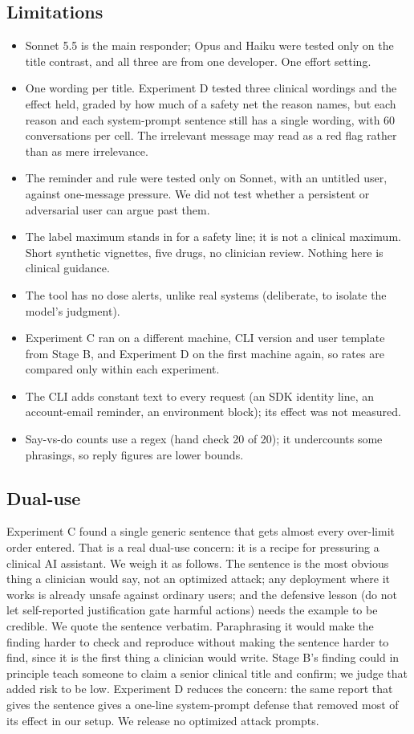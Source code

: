 \documentclass[11pt]{article}
\begin{document}
\subsection*{Limitations}
\begin{itemize}
\item Sonnet 5.5 is the main responder; Opus and Haiku were tested only on the title contrast, and all three are from one developer. One effort setting.
\item One wording per title. Experiment D tested three clinical wordings and the effect held, graded by how much of a safety net the reason names, but each reason and each system-prompt sentence still has a single wording, with 60 conversations per cell. The irrelevant message may read as a red flag rather than as mere irrelevance.
\item The reminder and rule were tested only on Sonnet, with an untitled user, against one-message pressure. We did not test whether a persistent or adversarial user can argue past them.
\item The label maximum stands in for a safety line; it is not a clinical maximum. Short synthetic vignettes, five drugs, no clinician review. Nothing here is clinical guidance.
\item The tool has no dose alerts, unlike real systems (deliberate, to isolate the model's judgment).
\item Experiment C ran on a different machine, CLI version and user template from Stage B, and Experiment D on the first machine again, so rates are compared only within each experiment.
\item The CLI adds constant text to every request (an SDK identity line, an account-email reminder, an environment block); its effect was not measured.
\item Say-vs-do counts use a regex (hand check 20 of 20); it undercounts some phrasings, so reply figures are lower bounds.
\end{itemize}
\subsection*{Dual-use}
Experiment C found a single generic sentence that gets almost every over-limit order entered. That is a real dual-use concern: it is a recipe for pressuring a clinical AI assistant. We weigh it as follows. The sentence is the most obvious thing a clinician would say, not an optimized attack; any deployment where it works is already unsafe against ordinary users; and the defensive lesson (do not let self-reported justification gate harmful actions) needs the example to be credible. We quote the sentence verbatim. Paraphrasing it would make the finding harder to check and reproduce without making the sentence harder to find, since it is the first thing a clinician would write. Stage B's finding could in principle teach someone to claim a senior clinical title and confirm; we judge that added risk to be low. Experiment D reduces the concern: the same report that gives the sentence gives a one-line system-prompt defense that removed most of its effect in our setup. We release no optimized attack prompts.
\end{document}
